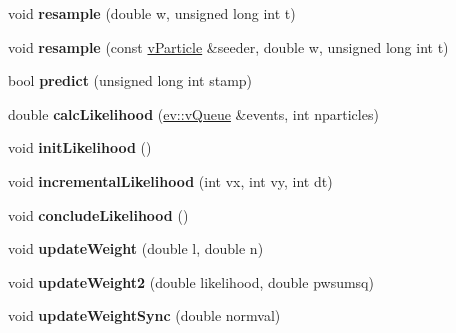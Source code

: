 \begin{DoxyCompactItemize}
\item 
void {\bfseries resample} (double w, unsigned long int t)\hypertarget{classvParticle_a007403ab415b51a555ae5c8ef2d57ddd}{}\label{classvParticle_a007403ab415b51a555ae5c8ef2d57ddd}

\item 
void {\bfseries resample} (const \hyperlink{classvParticle}{v\+Particle} \&seeder, double w, unsigned long int t)\hypertarget{classvParticle_a62003dd534e9caa94ec9944148f2f319}{}\label{classvParticle_a62003dd534e9caa94ec9944148f2f319}

\item 
bool {\bfseries predict} (unsigned long int stamp)\hypertarget{classvParticle_a100f92e97462a7044766c6533b195380}{}\label{classvParticle_a100f92e97462a7044766c6533b195380}

\item 
double {\bfseries calc\+Likelihood} (\hyperlink{classev_1_1vQueue}{ev\+::v\+Queue} \&events, int nparticles)\hypertarget{classvParticle_ad1370073f2b84f2650f3c0ed147bc906}{}\label{classvParticle_ad1370073f2b84f2650f3c0ed147bc906}

\item 
void {\bfseries init\+Likelihood} ()\hypertarget{classvParticle_aeb6f48a94882492e7959cab8cc670714}{}\label{classvParticle_aeb6f48a94882492e7959cab8cc670714}

\item 
void {\bfseries incremental\+Likelihood} (int vx, int vy, int dt)\hypertarget{classvParticle_a48eb9de4510ca5ad9eb27fcad770af95}{}\label{classvParticle_a48eb9de4510ca5ad9eb27fcad770af95}

\item 
void {\bfseries conclude\+Likelihood} ()\hypertarget{classvParticle_ae16c098e00f11d2858edef59fc323c53}{}\label{classvParticle_ae16c098e00f11d2858edef59fc323c53}

\item 
void {\bfseries update\+Weight} (double l, double n)\hypertarget{classvParticle_acac9cb115f7ee7a1200e3ef8c389f948}{}\label{classvParticle_acac9cb115f7ee7a1200e3ef8c389f948}

\item 
void {\bfseries update\+Weight2} (double likelihood, double pwsumsq)\hypertarget{classvParticle_abf7b613d453af4e82e58a7eddc373f43}{}\label{classvParticle_abf7b613d453af4e82e58a7eddc373f43}

\item 
void {\bfseries update\+Weight\+Sync} (double normval)\hypertarget{classvParticle_a71ac3f26d797818df2c671cb63ef5a60}{}\label{classvParticle_a71ac3f26d797818df2c671cb63ef5a60}


\end{DoxyCompactItemize}
